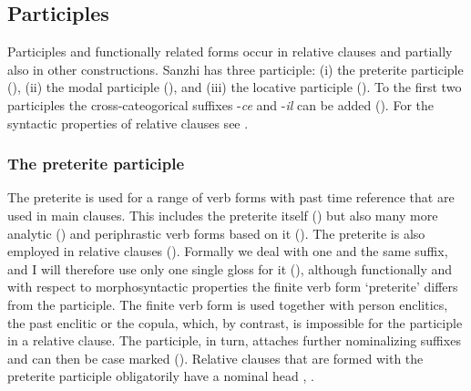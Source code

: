 \subsection{Participles}
\label{ssec:Participles and functionally related verb forms}

Participles and functionally related forms occur in relative clauses and partially also in other constructions. Sanzhi has three participle: (i) the preterite participle (), (ii) the modal participle (), and (iii) the locative participle (). To the first two participles the cross-cateogorical suffixes -\textit{ce} and -\textit{il} can be added (). For the syntactic properties of relative clauses see .



\subsubsection{The preterite participle}
\label{sssec:The preterite participle}

The preterite is used for a range of verb forms with past time reference that are used in main clauses. This includes the preterite itself () but also many more analytic () and periphrastic verb forms based on it (). The preterite is also employed in relative clauses (). Formally we deal with one and the same suffix, and I will therefore use only one single gloss for it (), although functionally and with respect to morphosyntactic properties the finite verb form `preterite' differs from the participle. The finite verb form is used together with person enclitics, the past enclitic or the copula, which, by contrast, is impossible for the participle in a relative clause. The participle, in turn, attaches further nominalizing suffixes  and can then be case marked (). Relative clauses that are formed with the preterite participle obligatorily have a nominal head , . 

